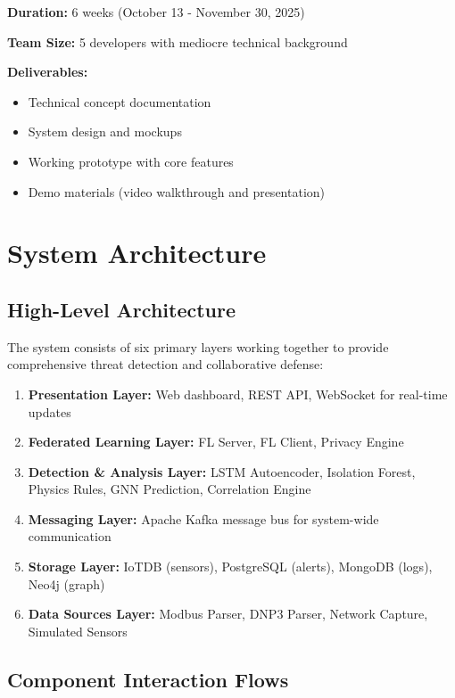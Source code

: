 \documentclass[12pt,a4paper]{article}
\begin{document}
\textbf{Duration:} 6 weeks (October 13 - November 30, 2025)

\textbf{Team Size:} 5 developers with mediocre technical background

\textbf{Deliverables:}
\begin{itemize}[leftmargin=1cm,itemsep=0pt]
    \item Technical concept documentation
    \item System design and mockups
    \item Working prototype with core features
    \item Demo materials (video walkthrough and presentation)
\end{itemize}

\section{System Architecture}

\subsection{High-Level Architecture}

The system consists of six primary layers working together to provide comprehensive threat detection and collaborative defense:

\begin{enumerate}[leftmargin=1cm,itemsep=0pt]
    \item \textbf{Presentation Layer:} Web dashboard, REST API, WebSocket for real-time updates
    \item \textbf{Federated Learning Layer:} FL Server, FL Client, Privacy Engine
    \item \textbf{Detection \& Analysis Layer:} LSTM Autoencoder, Isolation Forest, Physics Rules, GNN Prediction, Correlation Engine
    \item \textbf{Messaging Layer:} Apache Kafka message bus for system-wide communication
    \item \textbf{Storage Layer:} IoTDB (sensors), PostgreSQL (alerts), MongoDB (logs), Neo4j (graph)
    \item \textbf{Data Sources Layer:} Modbus Parser, DNP3 Parser, Network Capture, Simulated Sensors
\end{enumerate}

\subsection{Component Interaction Flows}
\end{document}

